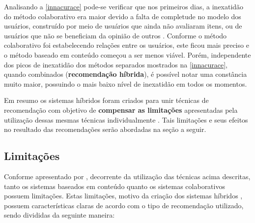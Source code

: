 \documentclass[12pt, openright, oneside, a4paper, brazil]{abntex2}
\begin{document}
Analisando a \autoref{innacurace} pode-se verificar que nos primeiros dias, a inexatidão do método colaborativo era maior devido a falta de completude no modelo dos usuários, construído por meio de usuários que ainda não avaliaram itens, ou de usuários que não se beneficiam da opinião de outros \cite{claypool1999combining}. Conforme o método colaborativo foi estabelecendo relações entre os usuários, este ficou mais preciso e o método baseado em conteúdo começou a ser menos viável. Porém, independente dos picos de inexatidão dos métodos separados mostrados na \autoref{innacurace}, quando combinados (\textbf{recomendação híbrida}), é possível notar uma constância muito maior, possuindo o mais baixo nível de inexatidão em todos os momentos.

Em resumo os sistemas híbridos foram criados para unir técnicas de recomendação com objetivo de \textbf{compensar as limitações} apresentadas pela utilização dessas mesmas técnicas individualmente \cite{balabanovic1997fab}. Tais limitações e seus efeitos no resultado das recomendações serão abordadas na seção a seguir.

\subsection{Limitações}

Conforme apresentado por , decorrente da utilização das técnicas acima descritas, tanto os sistemas baseados em conteúdo quanto os sistemas colaborativos possuem limitações. Estas limitações, motivo da criação dos sistemas híbridos \cite{balabanovic1997fab}, possuem características claras de acordo com o tipo de recomendação utilizado, sendo divididas da seguinte maneira:
\end{document}

